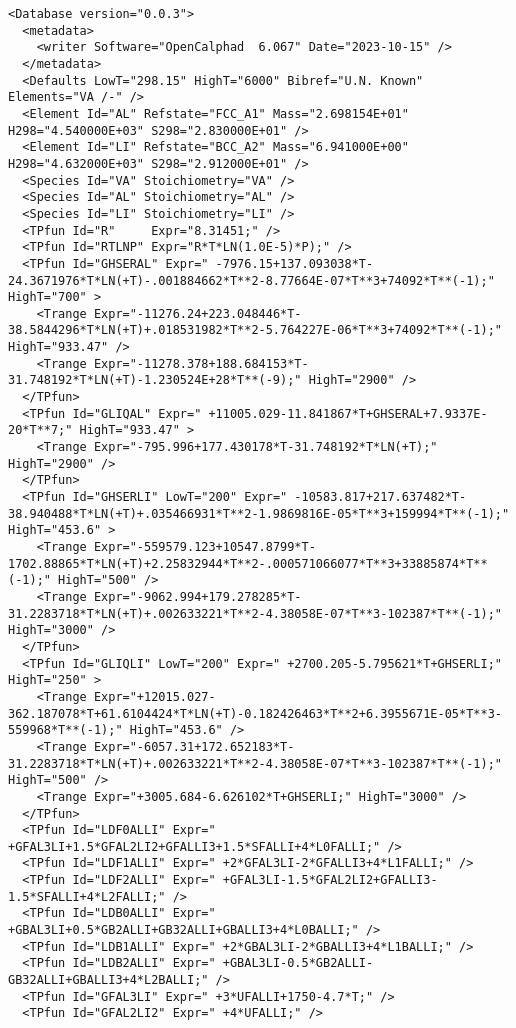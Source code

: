 \documentclass{article}
\begin{document}
\begin{appendices}
\begin{verbatim}
<Database version="0.0.3">
  <metadata>
    <writer Software="OpenCalphad  6.067" Date="2023-10-15" />
  </metadata>
  <Defaults LowT="298.15" HighT="6000" Bibref="U.N. Known" Elements="VA /-" />
  <Element Id="AL" Refstate="FCC_A1" Mass="2.698154E+01" H298="4.540000E+03" S298="2.830000E+01" />
  <Element Id="LI" Refstate="BCC_A2" Mass="6.941000E+00" H298="4.632000E+03" S298="2.912000E+01" />
  <Species Id="VA" Stoichiometry="VA" />
  <Species Id="AL" Stoichiometry="AL" />
  <Species Id="LI" Stoichiometry="LI" />
  <TPfun Id="R"     Expr="8.31451;" />
  <TPfun Id="RTLNP" Expr="R*T*LN(1.0E-5)*P);" />
  <TPfun Id="GHSERAL" Expr=" -7976.15+137.093038*T-24.3671976*T*LN(+T)-.001884662*T**2-8.77664E-07*T**3+74092*T**(-1);" HighT="700" >
    <Trange Expr="-11276.24+223.048446*T-38.5844296*T*LN(+T)+.018531982*T**2-5.764227E-06*T**3+74092*T**(-1);" HighT="933.47" />
    <Trange Expr="-11278.378+188.684153*T-31.748192*T*LN(+T)-1.230524E+28*T**(-9);" HighT="2900" /> 
  </TPfun>
  <TPfun Id="GLIQAL" Expr=" +11005.029-11.841867*T+GHSERAL+7.9337E-20*T**7;" HighT="933.47" >
    <Trange Expr="-795.996+177.430178*T-31.748192*T*LN(+T);" HighT="2900" /> 
  </TPfun>
  <TPfun Id="GHSERLI" LowT="200" Expr=" -10583.817+217.637482*T-38.940488*T*LN(+T)+.035466931*T**2-1.9869816E-05*T**3+159994*T**(-1);" HighT="453.6" >
    <Trange Expr="-559579.123+10547.8799*T-1702.88865*T*LN(+T)+2.25832944*T**2-.000571066077*T**3+33885874*T**(-1);" HighT="500" />
    <Trange Expr="-9062.994+179.278285*T-31.2283718*T*LN(+T)+.002633221*T**2-4.38058E-07*T**3-102387*T**(-1);" HighT="3000" /> 
  </TPfun>
  <TPfun Id="GLIQLI" LowT="200" Expr=" +2700.205-5.795621*T+GHSERLI;" HighT="250" >
    <Trange Expr="+12015.027-362.187078*T+61.6104424*T*LN(+T)-0.182426463*T**2+6.3955671E-05*T**3-559968*T**(-1);" HighT="453.6" />
    <Trange Expr="-6057.31+172.652183*T-31.2283718*T*LN(+T)+.002633221*T**2-4.38058E-07*T**3-102387*T**(-1);" HighT="500" />
    <Trange Expr="+3005.684-6.626102*T+GHSERLI;" HighT="3000" /> 
  </TPfun>
  <TPfun Id="LDF0ALLI" Expr=" +GFAL3LI+1.5*GFAL2LI2+GFALLI3+1.5*SFALLI+4*L0FALLI;" /> 
  <TPfun Id="LDF1ALLI" Expr=" +2*GFAL3LI-2*GFALLI3+4*L1FALLI;" /> 
  <TPfun Id="LDF2ALLI" Expr=" +GFAL3LI-1.5*GFAL2LI2+GFALLI3-1.5*SFALLI+4*L2FALLI;" /> 
  <TPfun Id="LDB0ALLI" Expr=" +GBAL3LI+0.5*GB2ALLI+GB32ALLI+GBALLI3+4*L0BALLI;" /> 
  <TPfun Id="LDB1ALLI" Expr=" +2*GBAL3LI-2*GBALLI3+4*L1BALLI;" /> 
  <TPfun Id="LDB2ALLI" Expr=" +GBAL3LI-0.5*GB2ALLI-GB32ALLI+GBALLI3+4*L2BALLI;" /> 
  <TPfun Id="GFAL3LI" Expr=" +3*UFALLI+1750-4.7*T;" /> 
  <TPfun Id="GFAL2LI2" Expr=" +4*UFALLI;" /> 

\end{verbatim}
\end{appendices}
\end{document}
